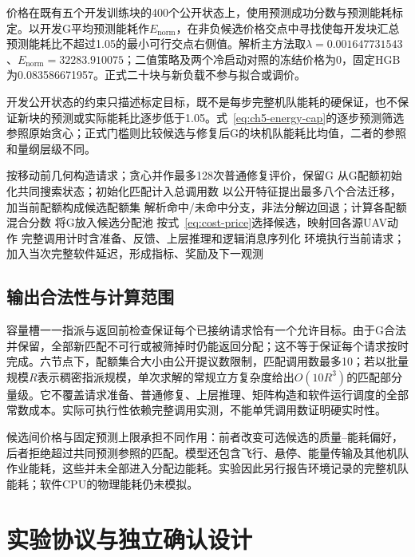价格在既有五个开发训练块的400个公开状态上，使用预测成功分数与预测能耗标定。以开发G平均预测能耗作$E_{\mathrm{norm}}$，在非负候选价格交点中寻找使每开发块汇总预测能耗比不超过1.05的最小可行交点右侧值。解析主方法取$\lambda=0.001647731543$、$E_{\mathrm{norm}}=32283.910075$；二值策略及两个冷启动对照的冻结价格为0，固定HGB为0.083586671957。正式二十块与新负载不参与拟合或调价。

开发公开状态的约束只描述标定目标，既不是每步完整机队能耗的硬保证，也不保证新块的预测或实际能耗比逐步低于1.05。式~\eqref{eq:ch5-energy-cap}的逐步预测筛选参照原始贪心；正式门槛则比较候选与修复后G的块机队能耗比均值，二者的参照和量纲层级不同。

\begin{algorithm}[!htbp]
\caption{解析缓存混合与候选间能耗定价}
\label{alg:cost-online}
按移动前几何构造请求；贪心并作最多128次普通修复评价，保留G\;
从G配额初始化共同搜索状态；初始化匹配计入总调用数\;
以公开特征提出最多八个合法迁移，加当前配额构成候选配额集\;
解析命中/未命中分支，非法分解边回退；计算各配额混合分数\;
将G放入候选分配池\;
按式~\eqref{eq:cost-price}选择候选，映射回各源UAV动作\;
完整调用计时含准备、反馈、上层推理和逻辑消息序列化\;
环境执行当前请求；加入当次完整软件延迟，形成指标、奖励及下一观测\;

\end{algorithm}

\subsection{输出合法性与计算范围}
容量槽一一指派与返回前检查保证每个已接纳请求恰有一个允许目标。由于G合法并保留，全部新匹配不可行或被筛掉时仍能返回分配；这不等于保证每个请求按时完成。六节点下，配额集合大小由公开提议数限制，匹配调用数最多10；若以批量规模$R$表示稠密指派规模，单次求解的常规立方复杂度给出$O(10R^3)$的匹配部分量级。它不覆盖请求准备、普通修复、上层推理、矩阵构造和软件运行调度的全部常数成本。实际可执行性依赖完整调用实测，不能单凭调用数证明硬实时性。

候选间价格与固定预测上限承担不同作用：前者改变可选候选的质量--能耗偏好，后者拒绝超过共同预测参照的匹配。模型还包含飞行、悬停、能量传输及其他机队作业能耗，这些并未全部进入分配边能耗。实验因此另行报告环境记录的完整机队能耗；软件CPU的物理能耗仍未模拟。

\section{实验协议与独立确认设计}
\label{sec:whole-protocol}
\label{sec:ch5-protocol}
